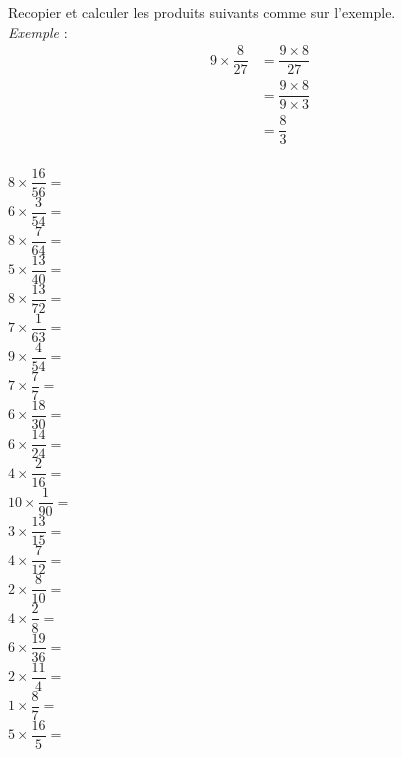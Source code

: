 \begin{multicols}{2}
Recopier et calculer les produits suivants comme sur l'exemple. \\
\textit{Exemple} : \columnbreak
\begin{align*}
9\times \dfrac{8}{27}&= \dfrac{ 9\times8}{27}\\
                    &=\dfrac{9\times 8}{9\times 3}\\
                    &=\dfrac{8}{3}\\
\end{align*}
\end{multicols}
\begin{multicols}{4} \setlength{\columnseprule}{0.5pt}
$8\times \dfrac{16}{56}=$ \dotfill \\ \vskip 0.3cm $6\times
\dfrac{3}{54}=$ \dotfill \\ \vskip 0.3cm $8\times \dfrac{7}{64}=$
\dotfill \\ \vskip 0.3cm $5\times \dfrac{13}{40}=$ \dotfill \\
\vskip 0.3cm $8\times \dfrac{13}{72}=$ \dotfill \\ \vskip 0.3cm
$7\times \dfrac{1}{63}=$ \dotfill \\ \vskip 0.3cm $9\times
\dfrac{4}{54}=$ \dotfill \\ \vskip 0.3cm $7\times \dfrac{7}{7}=$
\dotfill \\ \vskip 0.3cm $6\times \dfrac{18}{30}=$ \dotfill \\
\vskip 0.3cm $6\times \dfrac{14}{24}=$ \dotfill \\ \vskip 0.3cm
$4\times \dfrac{2}{16}=$ \dotfill \\ \vskip 0.3cm $10\times
\dfrac{1}{90}=$ \dotfill \\ \vskip 0.3cm $3\times \dfrac{13}{15}=$
\dotfill \\ \vskip 0.3cm $4\times \dfrac{7}{12}=$ \dotfill \\
\vskip 0.3cm $2\times \dfrac{8}{10}=$ \dotfill \\ \vskip 0.3cm
$4\times \dfrac{2}{8}=$ \dotfill \\ \vskip 0.3cm $6\times
\dfrac{19}{36}=$ \dotfill \\ \vskip 0.3cm $2\times \dfrac{11}{4}=$
\dotfill \\ \vskip 0.3cm $1\times \dfrac{8}{7}=$ \dotfill \\
\vskip 0.3cm $5\times \dfrac{16}{5}=$ \dotfill \\ \vskip 0.3cm
\end{multicols}
\setlength{\columnseprule}{0pt}